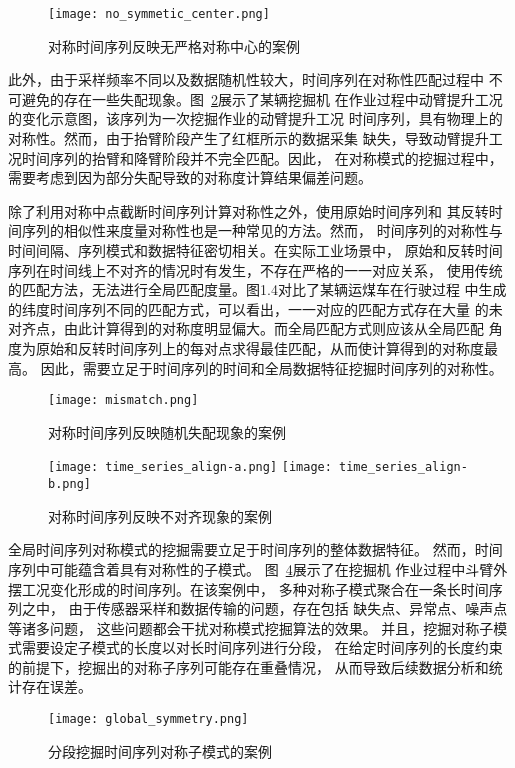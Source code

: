 \begin{figure}[h]
  \centering
  \texttt{[image: no\_symmetic\_center.png]}
  \caption{对称时间序列反映无严格对称中心的案例}
  \label{fig:no_symmetic_center}
\end{figure}

此外，由于采样频率不同以及数据随机性较大，时间序列在对称性匹配过程中
不可避免的存在一些失配现象。图~\ref{fig:mismatch}展示了某辆挖掘机
在作业过程中动臂提升工况的变化示意图，该序列为一次挖掘作业的动臂提升工况
时间序列，具有物理上的对称性。然而，由于抬臂阶段产生了红框所示的数据采集
缺失，导致动臂提升工况时间序列的抬臂和降臂阶段并不完全匹配。因此，
在对称模式的挖掘过程中，需要考虑到因为部分失配导致的对称度计算结果偏差问题。

除了利用对称中点截断时间序列计算对称性之外，使用原始时间序列和
其反转时间序列的相似性来度量对称性也是一种常见的方法。然而，
时间序列的对称性与时间间隔、序列模式和数据特征密切相关。在实际工业场景中，
原始和反转时间序列在时间线上不对齐的情况时有发生，不存在严格的一一对应关系，
使用传统的匹配方法，无法进行全局匹配度量。图1.4对比了某辆运煤车在行驶过程
中生成的纬度时间序列不同的匹配方式，可以看出，一一对应的匹配方式存在大量
的未对齐点，由此计算得到的对称度明显偏大。而全局匹配方式则应该从全局匹配
角度为原始和反转时间序列上的每对点求得最佳匹配，从而使计算得到的对称度最高。
因此，需要立足于时间序列的时间和全局数据特征挖掘时间序列的对称性。
\begin{figure}
  \centering
  \texttt{[image: mismatch.png]}
  \caption{对称时间序列反映随机失配现象的案例}
  \label{fig:mismatch}
\end{figure}
\begin{figure}
  \centering
    {\texttt{[image: time\_series\_align-a.png]}}
    {\texttt{[image: time\_series\_align-b.png]}}
  \caption{对称时间序列反映不对齐现象的案例}
  \label{fig:time_series_align}
\end{figure}

全局时间序列对称模式的挖掘需要立足于时间序列的整体数据特征。
然而，时间序列中可能蕴含着具有对称性的子模式。
图~\ref{fig:segement_symmetric_pattern}展示了在挖掘机
作业过程中斗臂外摆工况变化形成的时间序列。在该案例中，
多种对称子模式聚合在一条长时间序列之中，
由于传感器采样和数据传输的问题，存在包括
缺失点、异常点、噪声点等诸多问题，
这些问题都会干扰对称模式挖掘算法的效果。
并且，挖掘对称子模式需要设定子模式的长度以对长时间序列进行分段，
在给定时间序列的长度约束的前提下，挖掘出的对称子序列可能存在重叠情况，
从而导致后续数据分析和统计存在误差。
\begin{figure}
  \centering
  \texttt{[image: global\_symmetry.png]}
  \caption{分段挖掘时间序列对称子模式的案例}
  \label{fig:segement_symmetric_pattern}
\end{figure}

